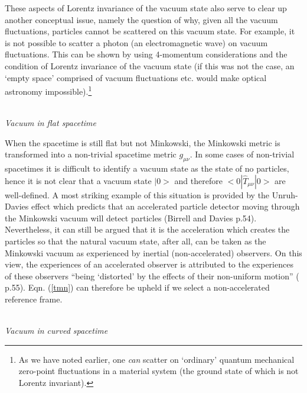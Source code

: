 \documentclass[12pt]{article}
\begin{document}
These aspects of Lorentz invariance of the vacuum state also serve to
clear up another conceptual issue, namely the question of why, given
all the vacuum fluctuations, particles 
cannot be scattered on this vacuum state. For example, it is not 
possible to scatter a photon (an electromagnetic
wave) on vacuum fluctuations. This can be shown by using 4-momentum
considerations and the condition of Lorentz invariance of the
vacuum state (if this was not the case, an `empty space' comprised
of vacuum fluctuations etc. would make optical astronomy
impossible).\footnote{As we have noted earlier, one {\em can} scatter on
`ordinary' quantum mechanical zero-point fluctuations in a material 
system (the ground state of which is not Lorentz invariant).} 
 

\ \\
{\em  Vacuum in flat spacetime}

When the spacetime is still flat but not Minkowski, the Minkowski
metric is transformed into a non-trivial spacetime metric
$g_{\mu\nu}$. In some cases of non-trivial spacetimes it is
difficult to identify a vacuum state as the state of no particles,
hence it is not clear that a vacuum state $|0>$ and therefore
$<0|\hat{T}_{\mu\nu}|0>$ are well-defined. A most striking example
of this situation is provided by the Unruh-Davies effect which
predicts that an accelerated particle detector moving through the
Minkowski vacuum will detect particles (Birrell and Davies
\cite{birrell82} p.54). Nevertheless, it can still be argued that
it is the acceleration which creates the particles so that the
natural vacuum state, after all, can be taken as the Minkowski
vacuum as experienced by inertial (non-accelerated) observers. On
this view, the experiences of an accelerated observer is
attributed to the experiences of these observers ``being
`distorted' by the effects of their non-uniform motion''
(\cite{birrell82} p.55). Eqn. (\ref{tmn}) can therefore be upheld
if we select a non-accelerated reference frame. 

\ \\
{\em Vacuum in curved spacetime}
\end{document}
